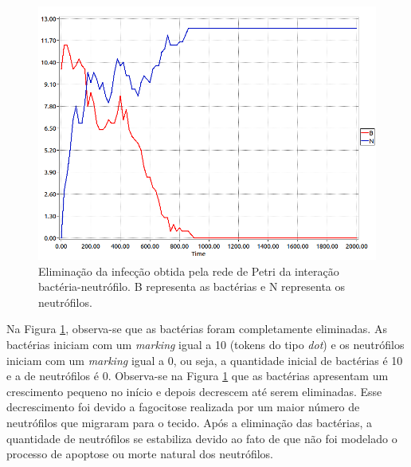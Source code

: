 \documentclass[a4paper,10pt]{article}
\begin{document}
		\begin{figure}
			\begin{center}
				\includegraphics[scale=0.45]{imagens/resultados/RedesimplesB_N-fig2.png}
			\end{center}
			\caption{Eliminação da infecção obtida pela rede de Petri da interação bactéria-neutrófilo.  
			B representa as bactérias e N representa os neutrófilos.}
			\label{redeSimples_fig2}
		\end{figure}
		
		Na Figura \ref{redeSimples_fig2}, observa-se que as bactérias foram completamente eliminadas. 
		As bactérias iniciam com um \textit{marking} igual a 10 (tokens do tipo \textit{dot}) e os neutrófilos iniciam com um \textit{marking} igual a 0, ou seja, 
		a quantidade inicial de bactérias é 10 e a de neutrófilos é 0. 		
		Observa-se na Figura \ref{redeSimples_fig2} que as bactérias apresentam um crescimento pequeno no início e depois decrescem até serem eliminadas. 
		Esse decrescimento foi devido a fagocitose realizada por um maior número de neutrófilos que migraram para o tecido. Após a eliminação das bactérias, 
		a quantidade de neutrófilos se estabiliza devido ao fato de que não foi modelado o processo de apoptose ou morte natural dos neutrófilos. 		
		
\end{document}
